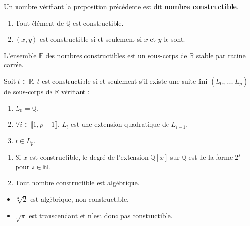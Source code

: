   \begin{definition}
    Un nombre vérifiant la proposition précédente est dit \textbf{nombre constructible}.
  \end{definition}

  \begin{proposition}
    \begin{enumerate}[label=(\roman*)]
      \item Tout élément de $\mathbb{Q}$ est constructible.
      \item $(x,y)$ est constructible si et seulement si $x$ et $y$ le sont.
    \end{enumerate}
  \end{proposition}

  \begin{theorem}
    L'ensemble $\mathbb{E}$ des nombres constructibles est un sous-corps de $\mathbb{R}$ stable par racine carrée.
  \end{theorem}
  

  \begin{theorem}[Wantzel]
    Soit $t \in \mathbb{R}$. $t$ est constructible si et seulement s'il existe une suite fini $(L_0, \dots, L_p)$ de sous-corps de $\mathbb{R}$ vérifiant :
    \begin{enumerate}[label=(\roman*)]
      \item $L_0 = \mathbb{Q}$.
      \item $\forall i \in \llbracket 1, p-1 \rrbracket$, $L_i$ est une extension quadratique de $L_{i-1}$.
      \item $t \in L_p$.
    \end{enumerate}
  \end{theorem}

  \begin{corollary}
    \begin{enumerate}[label=(\roman*)]
      \item Si $x$ est constructible, le degré de l'extension $\mathbb{Q}[x]$ sur $\mathbb{Q}$ est de la forme $2^s$ pour $s \in \mathbb{N}$.
      \item Tout nombre constructible est algébrique.
    \end{enumerate}
  \end{corollary}

  \begin{cexample}
    \begin{itemize}
      \item $\sqrt[3]{2}$ est algébrique, non constructible.
      \item $\sqrt{\pi}$ est transcendant et n'est donc pas constructible.
    \end{itemize}
  \end{cexample}

